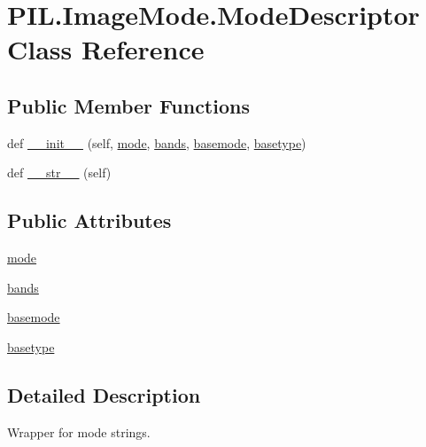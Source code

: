 \hypertarget{classPIL_1_1ImageMode_1_1ModeDescriptor}{}\section{P\+I\+L.\+Image\+Mode.\+Mode\+Descriptor Class Reference}
\label{classPIL_1_1ImageMode_1_1ModeDescriptor}
\subsection*{Public Member Functions}
\begin{DoxyCompactItemize}
\item 
def \hyperlink{classPIL_1_1ImageMode_1_1ModeDescriptor_a920436b3810531bcf51e4d5620d9fafa}{\+\_\+\+\_\+init\+\_\+\+\_\+} (self, \hyperlink{classPIL_1_1ImageMode_1_1ModeDescriptor_a69ff7b94268a37185b10180122f13af3}{mode}, \hyperlink{classPIL_1_1ImageMode_1_1ModeDescriptor_aacccf53c662845a2ad441b3741a1bb9a}{bands}, \hyperlink{classPIL_1_1ImageMode_1_1ModeDescriptor_af44a8236005a84a89801c390e79af5d9}{basemode}, \hyperlink{classPIL_1_1ImageMode_1_1ModeDescriptor_ac203fe70c08a2f78cf9209b899feceb5}{basetype})
\item 
def \hyperlink{classPIL_1_1ImageMode_1_1ModeDescriptor_aaa0c248f40a726ddec24451c2e73ca93}{\+\_\+\+\_\+str\+\_\+\+\_\+} (self)
\end{DoxyCompactItemize}
\subsection*{Public Attributes}
\begin{DoxyCompactItemize}
\item 
\hyperlink{classPIL_1_1ImageMode_1_1ModeDescriptor_a69ff7b94268a37185b10180122f13af3}{mode}
\item 
\hyperlink{classPIL_1_1ImageMode_1_1ModeDescriptor_aacccf53c662845a2ad441b3741a1bb9a}{bands}
\item 
\hyperlink{classPIL_1_1ImageMode_1_1ModeDescriptor_af44a8236005a84a89801c390e79af5d9}{basemode}
\item 
\hyperlink{classPIL_1_1ImageMode_1_1ModeDescriptor_ac203fe70c08a2f78cf9209b899feceb5}{basetype}
\end{DoxyCompactItemize}


\subsection{Detailed Description}
\begin{DoxyVerb}Wrapper for mode strings.\end{DoxyVerb}
 


